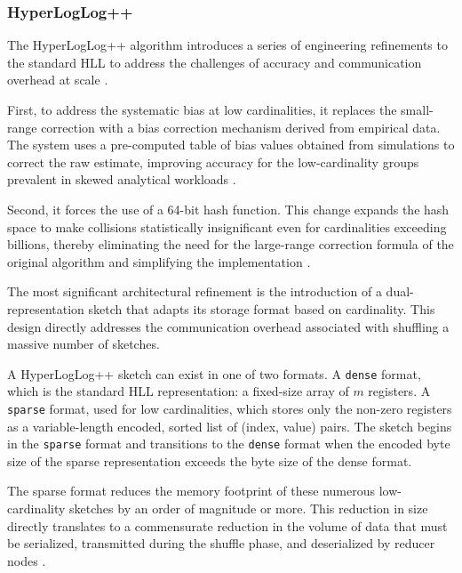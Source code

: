 \subsubsection{HyperLogLog++}

The HyperLogLog++ algorithm introduces a series of engineering refinements to the standard HLL to address the challenges of accuracy and communication overhead at scale \cite{Heule2013HyperLogLogIP}.

First, to address the systematic bias at low cardinalities, it replaces the small-range correction with a bias correction mechanism derived from empirical data. The system uses a pre-computed table of bias values obtained from simulations to correct the raw estimate, improving accuracy for the low-cardinality groups prevalent in skewed analytical workloads \cite{Heule2013HyperLogLogIP}.

Second, it forces the use of a 64-bit hash function. This change expands the hash space to make collisions statistically insignificant even for cardinalities exceeding billions, thereby eliminating the need for the large-range correction formula of the original algorithm and simplifying the implementation \cite{Heule2013HyperLogLogIP}.

The most significant architectural refinement is the introduction of a dual-representation sketch that adapts its storage format based on cardinality. This design directly addresses the communication overhead associated with shuffling a massive number of sketches.

\begin{definition}
    A HyperLogLog++ sketch can exist in one of two formats. A \texttt{dense} format, which is the standard HLL representation: a fixed-size array of $m$ registers. A \texttt{sparse} format, used for low cardinalities, which stores only the non-zero registers as a variable-length encoded, sorted list of (index, value) pairs. The sketch begins in the \texttt{sparse} format and transitions to the \texttt{dense} format when the encoded byte size of the sparse representation exceeds the byte size of the dense format.
\end{definition}

The sparse format reduces the memory footprint of these numerous low-cardinality sketches by an order of magnitude or more. This reduction in size directly translates to a commensurate reduction in the volume of data that must be serialized, transmitted during the shuffle phase, and deserialized by reducer nodes \cite{Heule2013HyperLogLogIP}.

